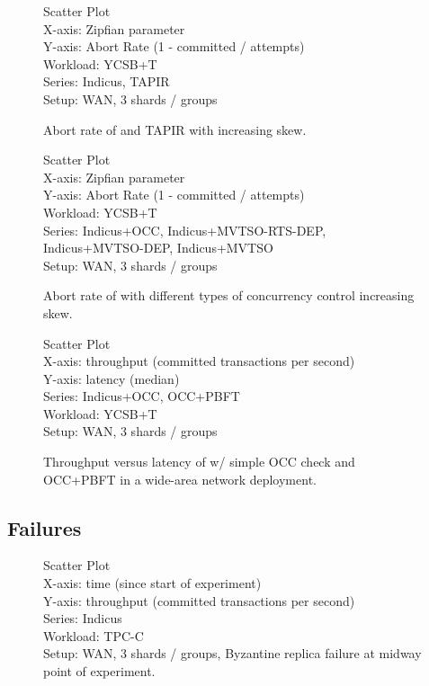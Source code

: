 \begin{figure}
  Scatter Plot\\
  X-axis: Zipfian parameter\\
  Y-axis: Abort Rate (1 - committed / attempts)\\
  Workload: YCSB+T\\
  Series: Indicus, TAPIR\\
  Setup: WAN, 3 shards / groups\\
  \caption{Abort rate of \sys{} and TAPIR with increasing skew.}
\end{figure}

\begin{figure}
  Scatter Plot\\
  X-axis: Zipfian parameter\\
  Y-axis: Abort Rate (1 - committed / attempts)\\
  Workload: YCSB+T\\
  Series: Indicus+OCC, Indicus+MVTSO-RTS-DEP, Indicus+MVTSO-DEP, Indicus+MVTSO\\
  Setup: WAN, 3 shards / groups\\
  \caption{Abort rate of \sys{} with different types of concurrency control
  increasing skew.}
\end{figure}

\begin{figure}
  Scatter Plot\\
  X-axis: throughput (committed transactions per second)\\
  Y-axis: latency (median)\\
  Series: Indicus+OCC, OCC+PBFT\\
  Workload: YCSB+T\\
  Setup: WAN, 3 shards / groups\\
  \caption{Throughput versus latency of \sys{} w/ simple OCC check and
  OCC+PBFT in a wide-area network deployment.}
  \label{fig:to-vs-po-tput-lat}
\end{figure}

\subsection{Failures}

\begin{figure}
  Scatter Plot\\
  X-axis: time (since start of experiment)\\
  Y-axis: throughput (committed transactions per second)\\
  Series: Indicus\\
  Workload: TPC-C\\
  Setup: WAN, 3 shards / groups, Byzantine replica failure at midway point of
  experiment.\\
\end{figure}

